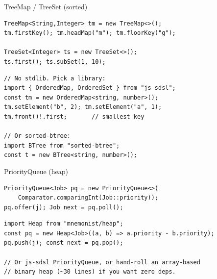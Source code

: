 \documentclass[10pt]{article}
\begin{document}
\begin{construct}{TreeMap / TreeSet (sorted)}
\noindent
\begin{minipage}[t]{0.485\linewidth}
\begin{lstlisting}[style=java, title=Java]
TreeMap<String,Integer> tm = new TreeMap<>();
tm.firstKey(); tm.headMap("m"); tm.floorKey("g");

TreeSet<Integer> ts = new TreeSet<>();
ts.first(); ts.subSet(1, 10);
\end{lstlisting}
\end{minipage}\hfill
\begin{minipage}[t]{0.485\linewidth}
\begin{lstlisting}[style=ts, title=TypeScript]
// No stdlib. Pick a library:
import { OrderedMap, OrderedSet } from "js-sdsl";
const tm = new OrderedMap<string, number>();
tm.setElement("b", 2); tm.setElement("a", 1);
tm.front()!.first;       // smallest key

// Or sorted-btree:
import BTree from "sorted-btree";
const t = new BTree<string, number>();
\end{lstlisting}
\end{minipage}
\end{construct}

\begin{construct}{PriorityQueue (heap)}
\noindent
\begin{minipage}[t]{0.485\linewidth}
\begin{lstlisting}[style=java, title=Java]
PriorityQueue<Job> pq = new PriorityQueue<>(
    Comparator.comparingInt(Job::priority));
pq.offer(j); Job next = pq.poll();
\end{lstlisting}
\end{minipage}\hfill
\begin{minipage}[t]{0.485\linewidth}
\begin{lstlisting}[style=ts, title=TypeScript]
import Heap from "mnemonist/heap";
const pq = new Heap<Job>((a, b) => a.priority - b.priority);
pq.push(j); const next = pq.pop();

// Or js-sdsl PriorityQueue, or hand-roll an array-based
// binary heap (~30 lines) if you want zero deps.
\end{lstlisting}
\end{minipage}
\end{construct}

\end{document}
